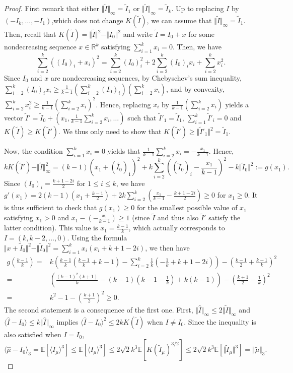 \documentclass[10pt,11pt]{amsart}%
\begin{document}
\begin{proof}
First remark that either $\Vert \tilde{I}\Vert_{\infty}=\tilde{I}_1$ or $\Vert \tilde{I}\Vert_{\infty}=\tilde{I}_k$. Up to replacing $I$ by $(-I_k,\ldots,-I_1)$,which does not change $K(\tilde{I})$, we can assume that $\Vert \tilde{I}\Vert_{\infty}=\tilde{I}_1$. Then, recall that $K(\tilde{I})=\Vert \tilde{I}\Vert^2-\Vert I_0\Vert^2$ and write $\tilde{I}=I_0+x$ for some nondecreasing sequence $x\in \mathbb{R}^k$ satisfying $\sum_{i=1}^kx_i=0$. Then, we have
$$\sum_{i=2}^k((I_0)_i+x_i)^2=\sum_{i=2}^k(I_0)_i^2+2\sum_{i=2}^k(I_0)_ix_i+\sum_{i=2}^kx_i^2.$$
Since $I_0$ and $x$ are nondecreasing sequences, by Chebyschev's sum inequality, $\sum_{i=2}^k(I_0)_ix_i\geq \frac{1}{k-1}(\sum_{i=2}^k(I_0)_i)(\sum_{i=2}^kx_i)$, and by convexity, $\sum_{i=2}^kx_i^2\geq \frac{1}{k-1}\left(\sum_{i=2}^kx_i\right)^2$. Hence, replacing $x_i$ by $\frac{1}{k-1}\left(\sum_{i=2}^kx_i\right)$ yields a vector $\tilde{I}'=\tilde{I}_0+(x_1,\frac{1}{k-1}\sum_{i=2}^kx_i,\ldots)$ such that $\tilde{I}'_1=\tilde{I}_1$, $\sum_{i=1}^k\tilde{I}'_i=0$ and $K(\tilde{I})\geq K(\tilde{I}')$. We thus only need to show that $K(\tilde{I}')\geq \Vert \tilde{I}'_1\Vert^2=\tilde{I}_1$. 

Now, the condition $\sum_{i=1}^kx_i=0$ yields that $\frac{1}{k-1}\sum_{i=2}^kx_i=-\frac{x_1}{k-1}$. Hence,
$$kK(\tilde{I}')-\Vert \tilde{I}\Vert_{\infty}^2=(k-1)\left(x_1+(\tilde{I_0})_1\right)^2+k\sum_{i=2}^k\left((\tilde{I}_0)_i-\frac{x_1}{k-1}\right)^2-k\Vert \tilde{I}_0\Vert^2:=g(x_1).$$
Since $(I_0)_i=\frac{k+1-2i}{2}$ for $1\leq i\leq k$, we have $g'(x_1)=2(k-1)\left(x_1+\frac{k-1}{2}\right)+2k\sum_{i=2}^k\left(\frac{x_1}{k-1}-\frac{k+1-2i}{2}\right)\geq 0$ for $x_1\geq 0$. It is thus sufficient to check that $g(x_1)\geq 0$ for the smallest possible value of $x_1$ satisfying $x_1> 0$ and $x_1-\left(-\frac{x_1}{k-1}\right)\geq 1$ (since $\tilde{I}$ and thus also $\tilde{I}'$ satisfy the latter condition). This value is $x_1=\frac{k-1}{k}$, which actually corresponds to $I=(k,k-2,\ldots,0)$. Using the formula $\Vert x+\tilde{I}_0\Vert^2-\Vert \tilde{I}_0\Vert^2=\sum_{i=1}^kx_i(x_i+k+1-2i)$, we then have 
\begin{align*}
g\left(\frac{k-1}{k}\right)=&k\left(\frac{k-1}{k}\left(\frac{k-1}{k}+k-1\right)-\sum_{i=2}^k\frac{1}{k}\left(-\frac{1}{k}+k+1-2i\right)\right)-\left(\frac{k-1}{2}+\frac{k-1}{k}\right)^2\\
=&\left(\frac{(k-1)^2(k+1)}{k}-(k-1)\left(k-1-\frac{1}{k}\right)+k(k-1)\right)-\left(\frac{k+1}{2}-\frac{1}{k}\right)^2\\
=&k^2-1-\left(\frac{k+1}{2}\right)^2\geq 0.
\end{align*}
The second statement is a consequence of the first one. First, $\Vert \hat{I}\Vert_{\infty}\leq 2\Vert \tilde{I}\Vert_{\infty}$ and $\langle \hat{I}-I_0\rangle \leq k\Vert \hat{I}\Vert_{\infty}$ implies $\langle \hat{I}-I_0\rangle ^2\leq 2kK(\tilde{I})$ when $I\not=I_0$. Since the inequality is also satisfied when $I=I_0$,
$$\langle \hat{\mu}-I_0\rangle_3=\mathbb{E}\left[\langle I_{\mu}\rangle^3\right]\leq \mathbb{E}\left[\langle I_{\mu}\rangle^3\right]\leq 2\sqrt{2}k^3\mathbb{E}\left[K(\tilde{ I}_{\mu})^{3/2}\right]\leq 2\sqrt{2}k^3\mathbb{E}\left[\Vert\tilde{ I}_{\mu}\Vert^{3}\right]=\Vert \tilde{\mu}\Vert_3.$$
\end{proof}
\end{document}
